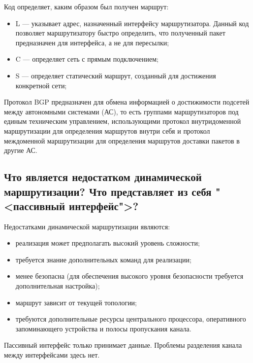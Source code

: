 Код определяет, каким образом был получен маршрут:
\begin{itemize}
    \item L --- указывает адрес, назначенный интерфейсу маршрутизатора.
    Данный код позволяет маршрутизатору быстро определить,
    что полученный пакет предназначен для интерфейса, а не для пересылки;
    \item C --- определяет сеть с прямым подключением;
    \item S --- определяет статический маршрут,
    созданный для достижения конкретной сети;
\end{itemize}

Протокол BGP предназначен для обмена информацией о достижимости подсетей
между автономными системами (АС), то есть группами маршрутизаторов
под единым техническим управлением, использующими протокол
внутридоменной маршрутизации для определения маршрутов внутри себя
и протокол междоменной маршрутизации для определения маршрутов
доставки пакетов в другие АС.

\subsection{Что является недостатком динамической маршрутизации?
Что представляет из себя "<пассивный интерфейс">?}

Недостатками динамической маршрутизации являются:

\begin{itemize}
    \item реализация может предполагать высокий уровень сложности;
    \item требуется знание дополнительных команд для реализации;
    \item менее безопасна (для обеспечения высокого уровня безопасности
    требуется дополнительная настройка);
    \item маршрут зависит от текущей топологии;
    \item требуются дополнительные ресурсы центрального процессора,
    оперативного запоминающего устройства и полосы пропускания канала.
\end{itemize}

Пассивный интерфейс только принимает данные.
Проблемы разделения канала между интерфейсами здесь нет.